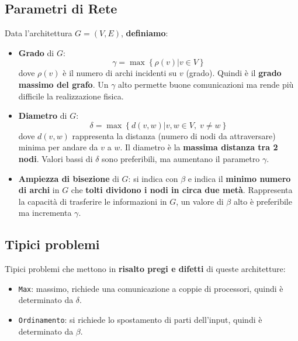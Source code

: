 \subsection{Parametri di Rete}

Data l'architettura $G = (V,E)$, \textbf{definiamo}: 
\begin{itemize}
	\item \textbf{Grado} di $G$:
	$$ \gamma = \max \left\{ \rho (v) | v \in V \right\}$$
	dove $\rho (v)$ è il numero di archi incidenti su $v$ (grado). Quindi è il \textbf{grado massimo del grafo}. Un $\gamma$ alto permette buone comunicazioni ma rende più difficile la realizzazione fisica.\\
	
	\item \textbf{Diametro} di $G$: 
	$$ \delta = \max \left\{ d(v,w) | v,w \in V, \; v \neq w \right\}$$
	dove $d(v,w)$ rappresenta la distanza (numero di nodi da attraversare) minima per andare da $v$ a $w$. Il diametro è la \textbf{massima distanza tra 2 nodi}. Valori bassi di $\delta$ sono preferibili, ma aumentano il parametro $\gamma$.\\
	
	\item \textbf{Ampiezza di bisezione} di $G$: si indica con $\beta$ e indica il \textbf{minimo numero di archi} in $G$ che \textbf{tolti dividono i nodi in circa due metà}. Rappresenta la capacità di trasferire le informazioni in $G$, un valore di $\beta$ alto è preferibile ma incrementa $\gamma$.\\
\end{itemize}


\newpage

\subsection{Tipici problemi} 
Tipici problemi che mettono in \textbf{risalto pregi e difetti} di queste architetture:
\begin{itemize}
	\item \texttt{Max}: massimo, richiede una comunicazione a coppie di processori, quindi è determinato da $\delta$.\\
	
	\item \texttt{Ordinamento}: si richiede lo spostamento di parti dell'input, quindi è determinato da $\beta$.\\
\end{itemize}

